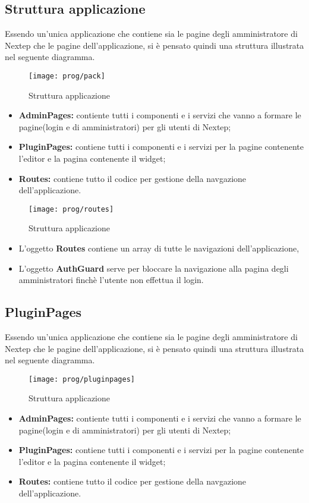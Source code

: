 \subsection{Struttura applicazione}
Essendo un'unica applicazione che contiene sia le pagine degli amministratore di Nextep che le pagine dell'applicazione, si è pensato quindi una struttura illustrata nel seguente diagramma.
\begin{figure}[!h] 
	\centering 
	\texttt{[image: prog/pack]} 
	\caption{Struttura applicazione}
\end{figure}
\begin{itemize}
	\item \textbf{AdminPages:} contiente tutti i componenti e i servizi che vanno a formare le pagine(login e di amministratori) per gli utenti di Nextep;
	\item \textbf{PluginPages:} contiene tutti i componenti e i servizi per la pagine contenente l'editor e la pagina contenente il widget;
	\item \textbf{Routes:} contiene tutto il codice per gestione della navgazione dell'applicazione.
\end{itemize}
\begin{figure}[!h] 
	\centering 
	\texttt{[image: prog/routes]} 
	\caption{Struttura applicazione}
\end{figure}
\begin{itemize}
	\item L'oggetto \textbf{Routes} contiene un array di tutte le navigazioni dell'applicazione,
	\item L'oggetto \textbf{AuthGuard} serve per bloccare la navigazione alla pagina degli amministratori finchè l'utente non effettua il login. 
	\\
\end{itemize}
\subsection{PluginPages}
Essendo un'unica applicazione che contiene sia le pagine degli amministratore di Nextep che le pagine dell'applicazione, si è pensato quindi una struttura illustrata nel seguente diagramma.
\begin{figure}[!h] 
	\centering 
	\texttt{[image: prog/pluginpages]} 
	\caption{Struttura applicazione}
\end{figure}
\begin{itemize}
	\item \textbf{AdminPages:} contiente tutti i componenti e i servizi che vanno a formare le pagine(login e di amministratori) per gli utenti di Nextep;
	\item \textbf{PluginPages:} contiene tutti i componenti e i servizi per la pagine contenente l'editor e la pagina contenente il widget;
	\item \textbf{Routes:} contiene tutto il codice per gestione della navgazione dell'applicazione.
\end{itemize}
\newpage
